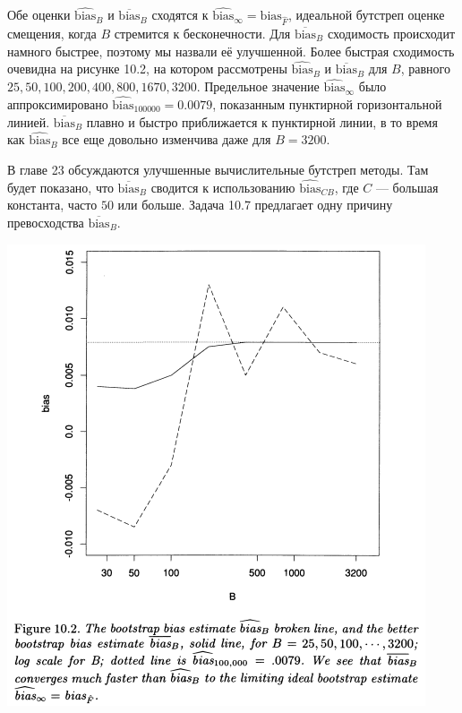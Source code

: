 Обе оценки $\widehat{\text{bias}}_{B}$ и $\overline{\text{bias}}_{B}$ сходятся к $\widehat{\text{bias}}_{\infty} = \text{bias}_{\hat{F}}$, идеальной бутстреп оценке смещения, когда $B$ стремится к бесконечности. Для $\overline{\text{bias}}_{B}$ сходимость происходит намного быстрее, поэтому мы назвали её улучшенной. Более быстрая сходимость очевидна на рисунке 10.2, на котором рассмотрены $\widehat{\text{bias}}_{B}$ и $\overline{\text{bias}}_{B}$ для $B$, равного $25, 50, 100, 200, 400, 800, 1670, 3200$. Предельное значение $\widehat{\text{bias}}_{\infty}$ было аппроксимировано $\widehat{\text{bias}}_{100000}= 0.0079$, показанным пунктирной горизонтальной линией. $\overline{\text{bias}}_{B}$ плавно и быстро приближается к пунктирной линии, в то время как $\widehat{\text{bias}}_{B}$ все еще довольно изменчива даже для $B = 3200$.

В главе 23 обсуждаются улучшенные вычислительные бутстреп методы. Там будет показано, что $\overline{\text{bias}}_{B}$ сводится к использованию $\widehat{\text{bias}}_{CB}$, где $C$ --- большая константа, часто $50$ или больше. Задача 10.7 предлагает одну причину превосходства $\overline{\text{bias}}_{B}$.

\noindent
\includegraphics[width=\linewidth]{10/f10.2.png}
\newline
